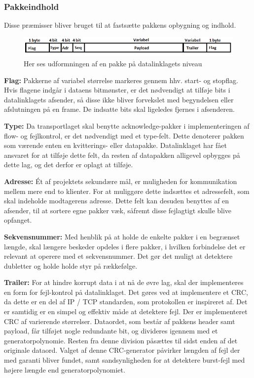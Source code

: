 \subsubsection{Pakkeindhold}
Disse præmisser bliver  bruget til at fastsætte pakkens opbygning og indhold.

\begin{figure}[h!]
\centering
\includegraphics[scale=0.8]{Billeder/DataLinkFrame.PNG}
\caption{Her ses udformningen af en pakke på datalinklagets niveau}
\label{fig:DataLinkFrame}
\end{figure}

\textbf{Flag:} Pakkerne af variabel størrelse markeres gennem hhv. start- og stopflag. Hvis flagene indgår i dataens bitmønster, er det nødvendigt at tilføje bits i datalinklagets afsender, så disse ikke bliver forvekslet med begyndelsen eller afslutningen på en frame. De indsatte bits skal ligeledes fjernes i afsenderen. 

\textbf{Type:} Da transportlaget skal benytte acknowledge-pakker i implementeringen af flow- og fejlkontrol, er det nødvendigt med et type-felt. Dette denoterer pakken som værende enten en kvitterings- eller datapakke. Datalinklaget har fået ansvaret for at tilføje dette felt, da resten af datapakken alligevel opbygges på dette lag, og det derfor er oplagt at tilføje.

\textbf{Adresse:} Ét af projektets sekundære mål, er muligheden for kommunikation mellem mere end to klienter. For at muliggøre dette indsættes et adressefelt, som skal indeholde modtagerens adresse. Dette felt kan desuden benyttes af en afsender, til at sortere egne pakker væk, såfremt disse fejlagtigt skulle blive opfanget.

\textbf{Sekvensnummer:} Med henblik på at holde de enkelte pakker i en begrænset længde, skal længere beskeder opdeles i flere pakker, i hvilken forbindelse det er relevant at operere med et sekvensnummer. Det gør det muligt at detektere dubletter og holde holde styr på rækkefølge.

\textbf{Trailer:} For at hindre korrupt data i at nå de øvre lag, skal der implementeres en form for fejl-kontrol på datalinklaget. Det gøres ved at implementere et CRC, da dette er en del af IP / TCP standarden, som protokollen er inspireret af. Det er samtidig er en simpel og effektiv måde at detektere fejl.
Der er implementeret CRC af varierende størrelser. Dataordet, som består af pakkens header samt payload, får tilføjet nogle redundante bit, og divideres igennem med et generatorpolynomie. Resten fra denne division påsættes til sidst enden af det originale dataord.	Valget af denne CRC-generator påvirker længden af fejl der med garanti bliver fundet, samt sandsynligheden for at detektere burst-fejl med højere længde end generatorpolynomiet.

